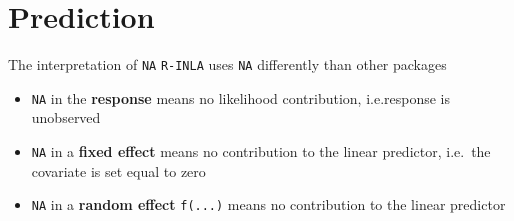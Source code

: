 \documentclass[
  handout]{beamer}
\begin{document}
\hypertarget{prediction}{%
\section{Prediction}\label{prediction}}

\begin{frame}[fragile]{The interpretation of \texttt{NA}}
\protect\hypertarget{the-interpretation-of-na}{}
\texttt{R-INLA} uses \texttt{NA} differently than other packages

\begin{itemize}
\item
  \texttt{NA} in the \textbf{response} means no likelihood contribution,
  i.e.response is unobserved
\item
  \texttt{NA} in a \textbf{fixed effect} means no contribution to the
  linear predictor, i.e.~the covariate is set equal to zero
\item
  \texttt{NA} in a \textbf{random effect} \texttt{f(...)} means no
  contribution to the linear predictor
\end{itemize}
\end{frame}
\end{document}
